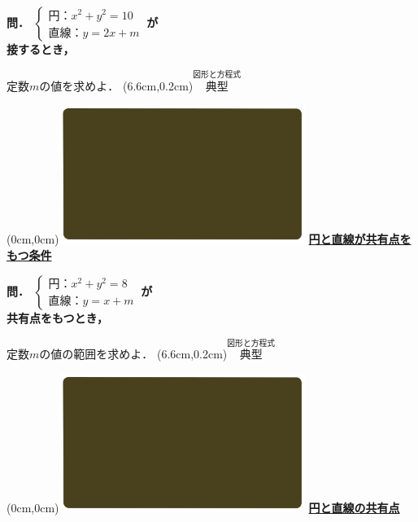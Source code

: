\documentclass[10pt,
fleqn,
dvipdfmx,
uplatex
]{jsarticle}
\begin{document}
\large
\bf\boldmath 問．
$\left\{\begin{array}{l} 円：x^2+y^2={10}\ \\直線：y=2x+m\ \end{array}\right.$が\\

\Huge
\vspace{-0.2zw}
\hspace{0.5zw}
接するとき，

\large
\vspace{0.4zw}
\hfill 定数$m$の値を求めよ．
\at(6.6cm,0.2cm){\small\color{bradorange}$\overset{\text{図形と方程式}}{\text{典型}}$}

\newpage

\at(0cm,0cm){\includegraphics[width=8cm,bb=0 0 1920 1080]{./youtube/thumbnails/templates/smart_background/図形と方程式.jpeg}}
{\color{orange}\bf\boldmath\Large\underline{円と直線が共有点をもつ条件}}\vspace{0.3zw}

\large
\bf\boldmath 問．
$\left\{\begin{array}{l} 円：x^2+y^2=8\ \\直線：y=x+m\ \end{array}\right.$が\\

\Huge
\vspace{-0.2zw}
\hspace{0.2zw}
共有点をもつとき，

\large
\vspace{0.4zw}
\hfill 定数$m$の値の範囲を求めよ．
\at(6.6cm,0.2cm){\small\color{bradorange}$\overset{\text{図形と方程式}}{\text{典型}}$}

\newpage

\at(0cm,0cm){\includegraphics[width=8cm,bb=0 0 1920 1080]{./youtube/thumbnails/templates/smart_background/図形と方程式.jpeg}}
{\color{orange}\bf\boldmath\LARGE\underline{円と直線の共有点}}\vspace{0.3zw}
\end{document}
